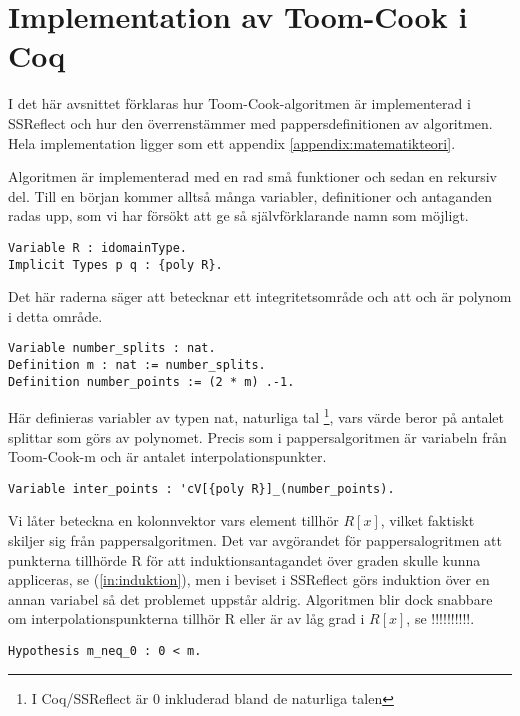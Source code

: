 \section{Implementation av Toom-Cook i Coq}
I det här avsnittet förklaras hur Toom-Cook-algoritmen är implementerad i
SSReflect och hur den överrenstämmer med pappersdefinitionen av algoritmen.
Hela implementation ligger som ett appendix \ref{appendix:matematikteori}.

Algoritmen är implementerad med en rad små funktioner och sedan en rekursiv
del. Till en början kommer alltså många variabler, definitioner och antaganden
radas upp, som vi har försökt att ge så självförklarande namn som möjligt.

\begin{lstlisting}
Variable R : idomainType.
Implicit Types p q : {poly R}.
\end{lstlisting}

Det här raderna säger att  betecknar ett integritetsområde och att 
och  är polynom i detta område.

\begin{lstlisting}
Variable number_splits : nat.
Definition m : nat := number_splits.
Definition number_points := (2 * m) .-1.
\end{lstlisting}

Här definieras variabler av typen nat, naturliga tal \footnote{I Coq/SSReflect
är 0 inkluderad bland de naturliga talen}, vars värde beror på antalet splittar
som görs av polynomet. Precis som i pappersalgoritmen är  variabeln från
Toom-Cook-m och  är antalet interpolationspunkter.

\begin{lstlisting}
Variable inter_points : 'cV[{poly R}]_(number_points).
\end{lstlisting}

Vi låter  beteckna en kolonnvektor vars element tillhör $R[x]$,
vilket faktiskt skiljer sig från pappersalgoritmen. Det var avgörandet för
pappersalogritmen att punkterna tillhörde R för att induktionsantagandet över
graden skulle kunna appliceras, se (\ref{in:induktion}), men i beviset i
SSReflect görs induktion över en annan variabel så det problemet uppstår
aldrig. Algoritmen blir dock snabbare om interpolationspunkterna tillhör R
eller är av låg grad i $R[x]$, se !!!!!!!!!!.

\begin{lstlisting}
Hypothesis m_neq_0 : 0 < m.
\end{lstlisting}

